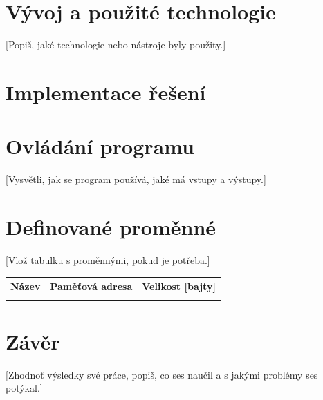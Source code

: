 \documentclass[10pt, a4paper]{article}
\begin{document}
\section{Vývoj a použité technologie}
[Popiš, jaké technologie nebo nástroje byly použity.]

\section{Implementace řešení}

\section{Ovládání programu}
[Vysvětli, jak se program používá, jaké má vstupy a výstupy.]

\section{Definované proměnné}
[Vlož tabulku s proměnnými, pokud je potřeba.]

\begin{center}
    \begin{tabularx}{0.8\textwidth}{
        | >{\raggedright\arraybackslash}X
        | >{\raggedright\arraybackslash}X
        | >{\raggedright\arraybackslash}X | }
         \hline
         Název & Paměťová adresa & Velikost [bajty] \\
         \hline
         [doplň údaje] &  &  \\
         \hline
    \end{tabularx}
\end{center}

\section{Závěr}
[Zhodnoť výsledky své práce, popiš, co ses naučil a s jakými problémy ses potýkal.]

\newpage


\end{document}

